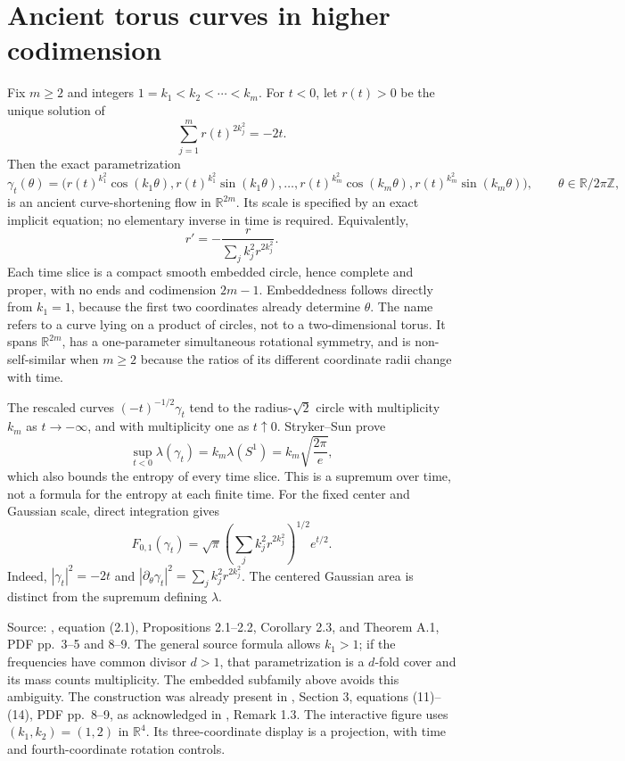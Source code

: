 \chapter{Ancient torus curves in higher codimension}\label{sec:catalogue-ancient-torus-curves}
\begin{example}\label{ex:catalogue-ancient-torus-curves}
Fix $m\geq2$ and integers $1=k_1<k_2<\cdots<k_m$. For $t<0$, let $r(t)>0$ be the unique solution of
\[
 \sum_{j=1}^m r(t)^{2k_j^2}=-2t.
\]
Then the exact parametrization
\[
 \gamma_t(\theta)=
 \bigl(r(t)^{k_1^2}\cos(k_1\theta),r(t)^{k_1^2}\sin(k_1\theta),
 \ldots,r(t)^{k_m^2}\cos(k_m\theta),r(t)^{k_m^2}\sin(k_m\theta)\bigr),
 \qquad \theta\in\mathbb R/2\pi\mathbb Z,
\]
is an ancient curve-shortening flow in $\mathbb R^{2m}$. Its scale is specified by an exact implicit equation; no elementary inverse in time is required. Equivalently,
\[
 r'=-\frac{r}{\sum_j k_j^2r^{2k_j^2}}.
\]
Each time slice is a compact smooth embedded circle, hence complete and proper, with no ends and codimension $2m-1$. Embeddedness follows directly from $k_1=1$, because the first two coordinates already determine $\theta$. The name refers to a curve lying on a product of circles, not to a two-dimensional torus. It spans $\mathbb R^{2m}$, has a one-parameter simultaneous rotational symmetry, and is non-self-similar when $m\geq2$ because the ratios of its different coordinate radii change with time.

The rescaled curves $(-t)^{-1/2}\gamma_t$ tend to the radius-$\sqrt2$ circle with multiplicity $k_m$ as $t\to-\infty$, and with multiplicity one as $t\uparrow0$. Stryker--Sun prove
\[
 \sup_{t<0}\lambda(\gamma_t)=k_m\lambda(S^1)
 =k_m\sqrt{\frac{2\pi}{e}},
\]
which also bounds the entropy of every time slice. This is a supremum over time, not a formula for the entropy at each finite time. For the fixed center and Gaussian scale, direct integration gives
\[
 F_{0,1}(\gamma_t)=\sqrt\pi\left(\sum_j k_j^2r^{2k_j^2}\right)^{1/2}e^{t/2}.
\]
Indeed, $|\gamma_t|^2=-2t$ and $|\partial_\theta\gamma_t|^2=\sum_jk_j^2r^{2k_j^2}$. The centered Gaussian area is distinct from the supremum defining $\lambda$.

Source: \cite{CatSS19}, equation (2.1), Propositions 2.1--2.2, Corollary 2.3, and Theorem A.1, PDF pp.~3--5 and 8--9. The general source formula allows $k_1>1$; if the frequencies have common divisor $d>1$, that parametrization is a $d$-fold cover and its mass counts multiplicity. The embedded subfamily above avoids this ambiguity. The construction was already present in \cite{CatAAAW13}, Section 3, equations (11)--(14), PDF pp.~8--9, as acknowledged in \cite{CatSS19}, Remark 1.3. The interactive figure uses $(k_1,k_2)=(1,2)$ in $\mathbb R^4$. Its three-coordinate display is a projection, with time and fourth-coordinate rotation controls.
\end{example}

